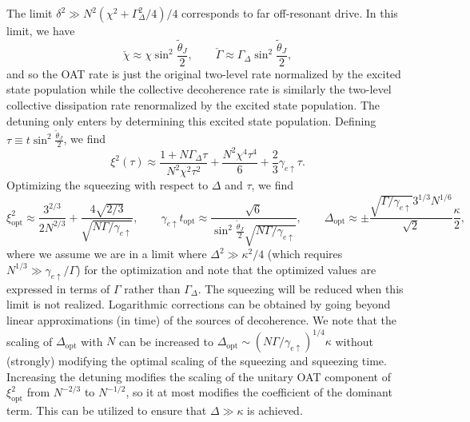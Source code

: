 The limit $\delta^2 \gg N^2 (\chi^2 + \Gamma_\Delta^2/4)/4$ corresponds to far off-resonant drive. In this limit, we have
\begin{equation}
    \check{\chi} \approx \chi \sin^2 \frac{\tilde{\theta}_J}{2}, \qquad \check{\Gamma} \approx \Gamma_\Delta \sin^2 \frac{\tilde{\theta}_J}{2},
\end{equation}
and so the OAT rate is just the original two-level rate normalized by the excited state population while the collective decoherence rate is similarly the two-level collective dissipation rate renormalized by the excited state population. The detuning only enters by determining this excited state population. Defining $\tau \equiv t \sin^2 \frac{\tilde{\theta}_J}{2}$, we find
\begin{equation}
    \xi^2(\tau) \approx \frac{1 + N \Gamma_\Delta \tau}{N^2 \chi^2 \tau^2} + \frac{N^2 \chi^4 \tau^4}{6} + \frac{2}{3} \gamma_{e \uparrow} \tau.
\end{equation}
Optimizing the squeezing with respect to $\Delta$ and $\tau$, we find
\begin{equation}
    \xi^2_{\text{opt}} \approx \frac{3^{2/3}}{2 N^{2/3}} + \frac{4 \sqrt{2/3}}{\sqrt{N \Gamma/\gamma_{e \uparrow}}} , \qquad \gamma_{e \uparrow} t_{\text{opt}} \approx \frac{\sqrt{6}}{ \sin^2 \frac{\tilde{\theta}_J}{2}  \sqrt{ N \Gamma /\gamma_{e \uparrow}}}, \qquad \Delta_{ \text{opt}} \approx \pm \frac{\sqrt{\Gamma/\gamma_{e \uparrow}} 3^{1/3}N^{1/6}}{ \sqrt{2}} \frac{\kappa}{2},
\end{equation}
where we assume we are in a limit where $\Delta^2 \gg \kappa^2/4$ (which requires $ N^{1/3} \gg \gamma_{e \uparrow}/\Gamma$) for the optimization and note that the optimized values are expressed in terms of $\Gamma$ rather than $\Gamma_\Delta$. The squeezing will be reduced when this limit is not realized.
Logarithmic corrections can be obtained by going beyond linear approximations (in time) of the sources of decoherence. We note that the scaling of $\Delta_{\text{opt}}$ with $N$ can be increased to $\Delta_{\text{opt}} \sim (N \Gamma/\gamma_{e \uparrow})^{1/4} \kappa$ without (strongly) modifying the optimal scaling of the squeezing and squeezing time. Increasing the detuning modifies the scaling of the unitary OAT component of $\xi^2_{\text{opt}}$ from $N^{-2/3}$ to $N^{-1/2}$, so it at most modifies the coefficient of the dominant term. This can be utilized to ensure that $\Delta \gg \kappa$ is achieved.

